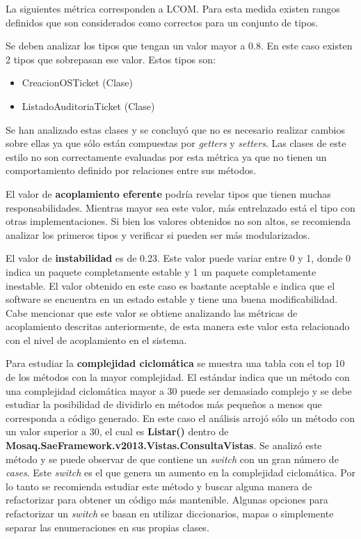 \documentclass[letterpaper]{article}
\begin{document}
La siguientes métrica corresponden a LCOM. Para esta medida existen rangos definidos que son considerados como correctos para un conjunto de tipos.

Se deben analizar los tipos que tengan un valor mayor a 0.8. En este caso existen 
2 tipos que sobrepasan ese valor. Estos tipos son:
\begin{itemize}
\item CreacionOSTicket (Clase)
\item ListadoAuditoriaTicket (Clase)	
\end{itemize}

Se han analizado estas clases y se concluyó que no es necesario realizar 
cambios sobre ellas ya que sólo están compuestas por \textit{getters} 
y \textit{setters}. Las clases de este estilo no son correctamente evaluadas 
por esta métrica ya que no tienen un comportamiento definido por relaciones 
entre sus métodos.

El valor de \textbf{acoplamiento eferente} podría revelar tipos que tienen 
muchas responsabilidades. Mientras mayor sea este valor, más entrelazado está 
el tipo con otras implementaciones. Si bien los valores obtenidos no son altos, 
se recomienda analizar los primeros tipos y verificar si pueden ser más modularizados.


El valor de \textbf{instabilidad} es de 0.23. Este valor puede variar entre 
0 y 1, donde 0 indica un paquete completamente estable y 1 un paquete 
completamente inestable. El valor obtenido en este caso es bastante aceptable 
e indica que el software se encuentra en un estado estable y tiene una buena 
modificabilidad. Cabe mencionar que este valor se obtiene analizando las 
métricas de acoplamiento descritas anteriormente, de esta manera este valor 
esta relacionado con el nivel de acoplamiento en el sistema.

Para estudiar la \textbf{complejidad ciclomática} se muestra una tabla con 
el top 10 de los métodos con la mayor complejidad. El estándar indica
que un método con una complejidad ciclomática mayor a 30 puede 
ser demasiado complejo y se debe estudiar la posibilidad de dividirlo en 
métodos más pequeños a menos que corresponda a código generado.
En este caso el análisis arrojó sólo un método con un valor superior a 30, 
el cual es \textbf{Listar()} dentro de \textbf{Mosaq.SaeFramework.v2013.Vistas.ConsultaVistas}.
Se analizó este método y se puede observar de que contiene un \textit{switch} 
con un gran número de \textit{cases}. Este \textit{switch} es el que genera 
un aumento en la complejidad ciclomática. Por lo tanto se recomienda estudiar 
este método y buscar alguna manera de refactorizar para obtener un código 
más mantenible. Algunas opciones para refactorizar un \textit{switch} 
se basan en utilizar diccionarios, mapas o simplemente separar las enumeraciones 
en sus propias clases.
\end{document}
